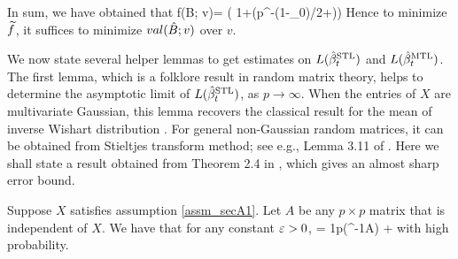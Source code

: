In sum, we have obtained that 
\be\label{approxvalid}
\wt f(\hat B; v)=  \cdot \left( 1+\OO(p^{-(1-\e_0)/2+\e})\right)
\ee
Hence to minimize $\widetilde f$, it suffices to minimize $val(\hat{B}; v)$ over $v$.


We now state several helper lemmas to get estimates on $L(\hat{\beta}_t^{\text{STL}})$ and $L(\hat{\beta}_t^{\text{MTL}})$. The first lemma, which is a folklore result in random matrix theory, helps to determine the asymptotic limit of $L(\hat{\beta}_t^{\text{STL}})$, as $p\to \infty$. When the entries of $X$ are multivariate Gaussian, this lemma recovers the classical result for the mean of inverse Wishart distribution \cite{anderson1958introduction}. For general non-Gaussian random matrices, it can be obtained from Stieltjes transform method; see e.g., Lemma 3.11 of \cite{bai2009spectral}. Here we shall state a result obtained from Theorem 2.4 in \cite{isotropic}, which gives an almost sharp error bound. 
\begin{lemma}\label{lem_minv} 
Suppose $X$ satisfies assumption \ref{assm_secA1}. Let $A$ be any $p\times p$ matrix that is independent of $X$. We have that for any constant ${\varepsilon}>0$,
	\be\label{XXA}   =  \frac1p\tr(\Sigma^{-1}A) + \ee
with high probability.
\end{lemma}


